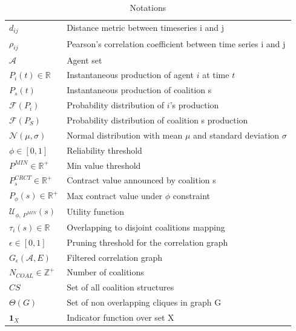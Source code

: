 \documentclass[conference]{IEEEtran}
\begin{document}
\begin{table}[t]
\centering
\scriptsize
\begin{tabular}{l|p{4.5cm}}
  \hline 
  $ d_{ij} $ & Distance metric between timeseries i and j \\
  $ \rho_{ij} $ & Pearson's correlation coefficient between time series i and j \\
  $ \mathcal{A} $ & Agent set \\
  $ P_{i}(t) \in \mathbb{R} $ & Instantaneous production of agent $i$ at time $t$ \\
  $ P_{s}(t) $ & Instantaneous production of coalition s \\
  $ \mathcal{F}(P_{i}) $ & Probability distribution of $i$'s production \\
  $ \mathcal{F}(P_{S}) $ & Probability distribution of coalition s production \\
  $ \mathcal{N}(\mu, \sigma) $ & Normal distribution with mean $ \mu $ and standard deviation $ \sigma $ \\
  $ \phi \in [0,1] $ & Reliability threshold \\
  $ P^{MIN} \in \mathbb{R}^+ $ & Min value threshold \\
  $ P_{s}^{CRCT} \in \mathbb{R}^+ $ & Contract value announced by coalition s \\
  $ P_{\phi}(s) \in \mathbb{R}^+ $ & Max contract value under $ \phi $ constraint \\
  $ \mathcal{U}_{\phi,\ P^{MIN}}(s) $ & Utility function \\
  $ \tau_{i}(s) \in \mathbb{R}$ & Overlapping to disjoint coalitions mapping \\
  $ \epsilon \in [0,1] $ & Pruning threshold for the correlation graph \\
  $ G_{\epsilon}(\mathcal{A}, E) $ & Filtered correlation graph \\
  $ N_{COAL} \in \mathbb{Z}^+ $ & Number of coalitions \\
  $ CS $ & Set of all coalition structures \\
  $ \Theta(G) $ & Set of non overlapping cliques in graph G \\
  $ \mathbf{1}_{X} $ & Indicator function over set X \\ 
  \hline
\end{tabular}

\caption{Notations\label{table1}}
\end{table}
\end{document}
